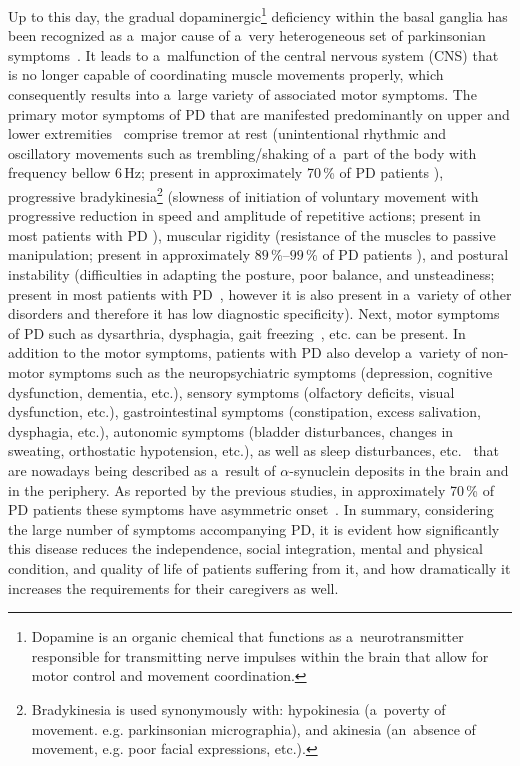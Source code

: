 Up to this day, the gradual dopaminergic\footnote{Dopamine is an organic chemical that functions as a~neurotransmitter responsible for transmitting nerve impulses within the brain that allow for motor control and movement coordination.} deficiency within the basal ganglia has been recognized as a~major cause of a~very heterogeneous set of parkinsonian symptoms~\cite{Brodal2003}. It leads to a~malfunction of the central nervous system (CNS) that is no longer capable of coordinating muscle movements properly, which consequently results into a~large variety of associated motor symptoms. The primary motor symptoms of PD that are manifested predominantly on upper and lower extremities~\cite{Hornykiewicz1998} comprise tremor at rest (unintentional rhythmic and oscillatory movements such as trembling/shaking of a~part of the body with frequency bellow $6$\,Hz; present in approximately 70\,\% of PD patients \cite{Hoehn1967, Hughes1993, Louis2001}), progressive bradykinesia\footnote{Bradykinesia is used synonymously with: hypokinesia (a~poverty of movement. e.g. parkinsonian micrographia), and akinesia (an~absence of movement, e.g. poor facial expressions, etc.).} (slowness of initiation of voluntary movement with progressive reduction in speed and amplitude of repetitive actions; present in most patients with PD \cite{Yanagisawa1989, Berardelli2001}), muscular rigidity (resistance of the muscles to passive manipulation; present in approximately $89$\,\%--$99$\,\% of PD patients \cite{Hoehn1967, Hughes1993, Louis1997}), and postural instability (difficulties in adapting the posture, poor balance, and unsteadiness; present in most patients with PD~\cite{Horak2005}, however it is also present in a~variety of other disorders and therefore it has low diagnostic specificity). Next, motor symptoms of PD such as dysarthria, dysphagia, gait freezing~\cite{Hornykiewicz1998, Ho1999a}, etc. can be present. In addition to the motor symptoms, patients with PD also develop a~variety of non-motor symptoms such as the neuropsychiatric symptoms (depression, cognitive dysfunction, dementia, etc.), sensory symptoms (olfactory deficits, visual dysfunction, etc.), gastrointestinal symptoms (constipation, excess salivation, dysphagia, etc.), autonomic symptoms (bladder disturbances, changes in sweating, orthostatic hypotension, etc.), as well as sleep disturbances, etc.~\cite{Hoehn1967} that are nowadays being described as a~result of $\alpha$-synuclein deposits in the brain and in the periphery. As reported by the previous studies, in approximately 70\,\% of PD patients these symptoms have asymmetric onset~\cite{Hughes1993}. In summary, considering the large number of symptoms accompanying PD, it is evident how significantly this disease reduces the independence, social integration, mental and physical condition, and quality of life of patients suffering from it, and how dramatically it increases the requirements for their caregivers as well.


